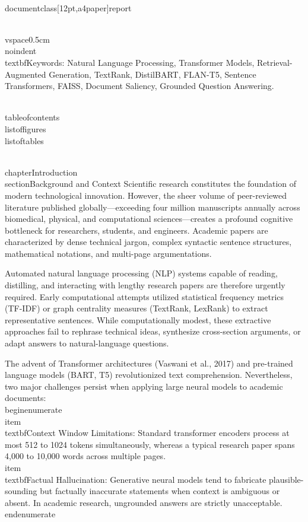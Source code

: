 \\documentclass[12pt,a4paper]{report}
\begin{document}
\\vspace{0.5cm}
\\noindent \\textbf{Keywords:} Natural Language Processing, Transformer Models, Retrieval-Augmented Generation, TextRank, DistilBART, FLAN-T5, Sentence Transformers, FAISS, Document Saliency, Grounded Question Answering.

\\tableofcontents
\\listoffigures
\\listoftables

\\chapter{Introduction}
\\section{Background and Context}
Scientific research constitutes the foundation of modern technological innovation. However, the sheer volume of peer-reviewed literature published globally—exceeding four million manuscripts annually across biomedical, physical, and computational sciences—creates a profound cognitive bottleneck for researchers, students, and engineers. Academic papers are characterized by dense technical jargon, complex syntactic sentence structures, mathematical notations, and multi-page argumentations.

Automated natural language processing (NLP) systems capable of reading, distilling, and interacting with lengthy research papers are therefore urgently required. Early computational attempts utilized statistical frequency metrics (TF-IDF) or graph centrality measures (TextRank, LexRank) to extract representative sentences. While computationally modest, these extractive approaches fail to rephrase technical ideas, synthesize cross-section arguments, or adapt answers to natural-language questions.

The advent of Transformer architectures (Vaswani et al., 2017) and pre-trained language models (BART, T5) revolutionized text comprehension. Nevertheless, two major challenges persist when applying large neural models to academic documents:
\\begin{enumerate}
    \\item \\textbf{Context Window Limitations:} Standard transformer encoders process at most 512 to 1024 tokens simultaneously, whereas a typical research paper spans 4,000 to 10,000 words across multiple pages.
    \\item \\textbf{Factual Hallucination:} Generative neural models tend to fabricate plausible-sounding but factually inaccurate statements when context is ambiguous or absent. In academic research, ungrounded answers are strictly unacceptable.
\\end{enumerate}
\end{document}
